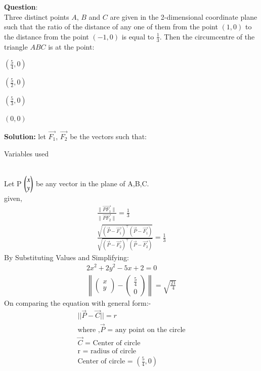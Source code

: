 \documentclass[journal]{IEEEtran}
\begin{document}
\textbf{Question}:\\
Three distinct points $A$, $B$ and $C$ are given in the 2-dimensional coordinate plane such that the ratio of the distance of any one of them from the point $(1,0)$ to the distance from the point $(-1,0)$ is equal to $\frac{1}{3}$. Then the circumcentre of the triangle $ABC$ is at the point:
\begin{enumerate}
\begin{multicols}{4}
\item $\left(\frac{5}{4}, 0\right)$
\item $\left(\frac{5}{2}, 0\right)$
\item $\left(\frac{5}{3}, 0\right)$
\item $(0, 0)$
\end{multicols}
\end{enumerate}
\textbf{Solution:}
let $\vec{F_1}$, $\vec{F_2}$ be the vectors such that:
\begin{table}[h!]
    \centering
    
    \caption{Variables used}
    \label{table 1.9.1}
\end{table}\\
  Let P $\begin{pmatrix}x\\y\end{pmatrix}$ be any vector in the plane of A,B,C.\\
  given,
\begin{align}
\frac{\| \vec{PF_1} \|}{\| \vec{PF_2} \|} = \frac{1}{3}\\
\frac{\sqrt{(\vec{P}-\vec{F_1})^\top (\vec{P}-\vec{F_1})}}{\sqrt{(\vec{P}-\vec{F_2})^\top (\vec{P}-\vec{F_2})}} = \frac{1}{3}
\end{align}
By Substituting Values and Simplifying:
\begin{align}
2x^2 + 2y^2 - 5x + 2 = 0\\
\left\lVert
\begin{pmatrix} x \\ y \end{pmatrix}
-
\begin{pmatrix} \tfrac{5}{4} \\ 0 \end{pmatrix}
\right\lVert
= \sqrt{\tfrac{21}{4}}
\end{align}
On comparing the equation with general form:-
\begin{align}
||\vec{P} - \vec{C}|| = r\\
\text{
where ,}
\text{
$\vec{P}$ = any point on the circle}\\
\text{$\vec{C}$ = Center of circle}\\
\text{
r = radius of circle}\\
\text{
Center of circle =  } \left(\frac{5}{4}, 0\right)
\end{align}
\end{document}
